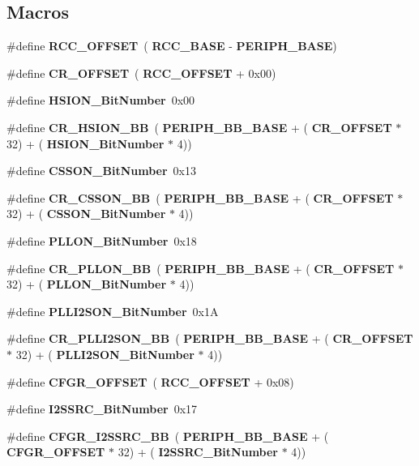 \subsection*{Macros}
\begin{DoxyCompactItemize}
\item 
\#define \textbf{ R\+C\+C\+\_\+\+O\+F\+F\+S\+ET}~(\textbf{ R\+C\+C\+\_\+\+B\+A\+SE} -\/ \textbf{ P\+E\+R\+I\+P\+H\+\_\+\+B\+A\+SE})
\item 
\#define \textbf{ C\+R\+\_\+\+O\+F\+F\+S\+ET}~(\textbf{ R\+C\+C\+\_\+\+O\+F\+F\+S\+ET} + 0x00)
\item 
\#define \textbf{ H\+S\+I\+O\+N\+\_\+\+Bit\+Number}~0x00
\item 
\#define \textbf{ C\+R\+\_\+\+H\+S\+I\+O\+N\+\_\+\+BB}~(\textbf{ P\+E\+R\+I\+P\+H\+\_\+\+B\+B\+\_\+\+B\+A\+SE} + (\textbf{ C\+R\+\_\+\+O\+F\+F\+S\+ET} $\ast$ 32) + (\textbf{ H\+S\+I\+O\+N\+\_\+\+Bit\+Number} $\ast$ 4))
\item 
\#define \textbf{ C\+S\+S\+O\+N\+\_\+\+Bit\+Number}~0x13
\item 
\#define \textbf{ C\+R\+\_\+\+C\+S\+S\+O\+N\+\_\+\+BB}~(\textbf{ P\+E\+R\+I\+P\+H\+\_\+\+B\+B\+\_\+\+B\+A\+SE} + (\textbf{ C\+R\+\_\+\+O\+F\+F\+S\+ET} $\ast$ 32) + (\textbf{ C\+S\+S\+O\+N\+\_\+\+Bit\+Number} $\ast$ 4))
\item 
\#define \textbf{ P\+L\+L\+O\+N\+\_\+\+Bit\+Number}~0x18
\item 
\#define \textbf{ C\+R\+\_\+\+P\+L\+L\+O\+N\+\_\+\+BB}~(\textbf{ P\+E\+R\+I\+P\+H\+\_\+\+B\+B\+\_\+\+B\+A\+SE} + (\textbf{ C\+R\+\_\+\+O\+F\+F\+S\+ET} $\ast$ 32) + (\textbf{ P\+L\+L\+O\+N\+\_\+\+Bit\+Number} $\ast$ 4))
\item 
\#define \textbf{ P\+L\+L\+I2\+S\+O\+N\+\_\+\+Bit\+Number}~0x1A
\item 
\#define \textbf{ C\+R\+\_\+\+P\+L\+L\+I2\+S\+O\+N\+\_\+\+BB}~(\textbf{ P\+E\+R\+I\+P\+H\+\_\+\+B\+B\+\_\+\+B\+A\+SE} + (\textbf{ C\+R\+\_\+\+O\+F\+F\+S\+ET} $\ast$ 32) + (\textbf{ P\+L\+L\+I2\+S\+O\+N\+\_\+\+Bit\+Number} $\ast$ 4))
\item 
\#define \textbf{ C\+F\+G\+R\+\_\+\+O\+F\+F\+S\+ET}~(\textbf{ R\+C\+C\+\_\+\+O\+F\+F\+S\+ET} + 0x08)
\item 
\#define \textbf{ I2\+S\+S\+R\+C\+\_\+\+Bit\+Number}~0x17
\item 
\#define \textbf{ C\+F\+G\+R\+\_\+\+I2\+S\+S\+R\+C\+\_\+\+BB}~(\textbf{ P\+E\+R\+I\+P\+H\+\_\+\+B\+B\+\_\+\+B\+A\+SE} + (\textbf{ C\+F\+G\+R\+\_\+\+O\+F\+F\+S\+ET} $\ast$ 32) + (\textbf{ I2\+S\+S\+R\+C\+\_\+\+Bit\+Number} $\ast$ 4))

\end{DoxyCompactItemize}

